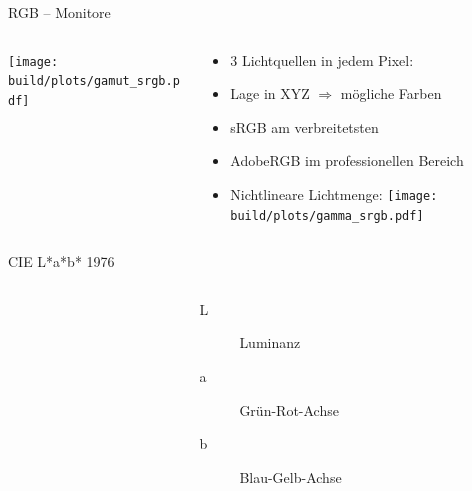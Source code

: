 \documentclass[aspectratio=1610, 9pt]{beamer}
\begin{document}
\begin{frame}{RGB – Monitore}
  \begin{columns}[onlytextwidth]%
    \begin{column}{0.495\textwidth}%
      \texttt{[image: build/plots/gamut\_srgb.pdf]}%
    \end{column}%
    \begin{column}{0.495\textwidth}%
      \begin{itemize}
        \item 3 Lichtquellen in jedem Pixel:
        \item Lage in XYZ ${}⇒{}$ mögliche Farben
        \item sRGB am verbreitetsten
        \item AdobeRGB im professionellen Bereich
        \item Nichtlineare Lichtmenge:
          \texttt{[image: build/plots/gamma\_srgb.pdf]}
      \end{itemize}
    \end{column}
  \end{columns}%
\end{frame}

\begin{frame}{CIE L*a*b* 1976}
  \begin{columns}[onlytextwidth]%
    \begin{column}{0.495\textwidth}%
    \end{column}%
    \begin{column}{0.495\textwidth}%
      \begin{description}
        \item[L] Luminanz
        \item[a] Grün-Rot-Achse
        \item[b] Blau-Gelb-Achse
      \end{description}
    \end{column}%
  \end{columns}%
\end{frame}
\end{document}
